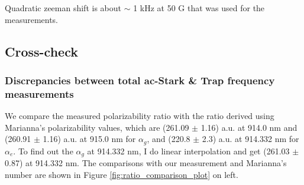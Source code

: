 			\noindent Quadratic zeeman shift is about $\sim$ 1 kHz at 50 G that was used for the measurements. 
















\subsection{Cross-check}
	\subsubsection{Discrepancies between total ac-Stark \& Trap frequency measurements}

		We compare the measured polarizability ratio with the ratio derived using Marianna's polarizability values, which are (261.09 $\pm$ 1.16) a.u. at 914.0 nm and (260.91 $\pm$ 1.16) a.u. at 915.0 nm for $\alpha_g$, and (220.8 $\pm$ 2.3) a.u. at 914.332 nm for $\alpha_e$. To find out the $\alpha_g$ at 914.332 nm, I do linear interpolation and get (261.03 $\pm$ 0.87) at 914.332 nm. The comparisons with our measurement and Marianna's number are shown in Figure \ref{fig:ratio_comparison_plot} on left.

